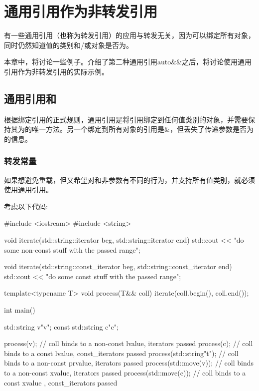 \section{通用引用作为非转发引用}
有一些通用引用（也称为转发引用）的应用与转发无关，因为可以绑定所有对象，同时仍然知道值的类别和/或对象是否为。

本章中，将讨论一些例子。介绍了第二种通用引用auto\&\&之后，将讨论使用通用引用作为非转发引用的实际示例。

\subsection{通用引用和}

根据绑定引用的正式规则，通用引用是将引用绑定到任何值类别的对象，并需要保持其为的唯一方法。另一个绑定到所有对象的引用是\&，但丢失了传递参数是否为的信息。

\subsubsection{转发常量}

如果想避免重载，但又希望对和非参数有不同的行为，并支持所有值类别，就必须使用通用引用。

考虑以下代码:

\begin{cppcode}
#include <iostream>
#include <string>

void iterate(std::string::iterator beg, std::string::iterator end)
{
	std::cout << "do some non-const stuff with the passed range\n";
}

void iterate(std::string::const_iterator beg, std::string::const_iterator end)
{
	std::cout << "do some const stuff with the passed range\n";
}

template<typename T>
void process(T&& coll)
{
	iterate(coll.begin(), coll.end());
}

int main()
{
	std::string v{"v"};
	const std::string c{"c"};

	process(v); // coll binds to a non-const lvalue, iterators passed
	process(c); // coll binds to a const lvalue, const_iterators passed
	process(std::string{"t"}); // coll binds to a non-const prvalue, iterators passed
	process(std::move(v)); // coll binds to a non-const xvalue, iterators passed
	process(std::move(c)); // coll binds to a const xvalue , const_iterators passed
}
\end{cppcode}

